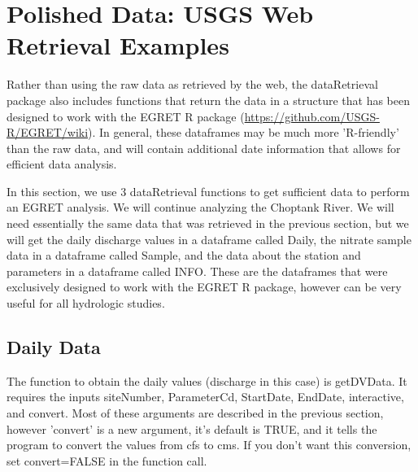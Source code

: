 \documentclass[a4paper,11pt]{article}
\begin{document}
\section{Polished Data: USGS Web Retrieval Examples}
Rather than using the raw data as retrieved by the web, the dataRetrieval package also includes functions that return the data in a structure that has been designed to work with the EGRET R package (\url{https://github.com/USGS-R/EGRET/wiki}). In general, these dataframes may be much more 'R-friendly' than the raw data, and will contain additional date information that allows for efficient data analysis.

In this section, we use 3 dataRetrieval functions to get sufficient data to perform an EGRET analysis.  We will continue analyzing the Choptank River. We will need essentially the same data that was retrieved in the previous section, but we will get the daily discharge values in a dataframe called Daily, the nitrate sample data in a dataframe called Sample, and the data about the station and parameters in a dataframe called INFO. These are the dataframes that were exclusively designed to work with the EGRET R package, however can be very useful for all hydrologic studies.

\subsection{Daily Data}
The function to obtain the daily values (discharge in this case) is getDVData.  It requires the inputs siteNumber, ParameterCd, StartDate, EndDate, interactive, and convert. Most of these arguments are described in the previous section, however 'convert' is a new argument, it's default is TRUE, and it tells the program to convert the values from cfs to cms. If you don't want this conversion, set convert=FALSE in the function call.
\end{document}
